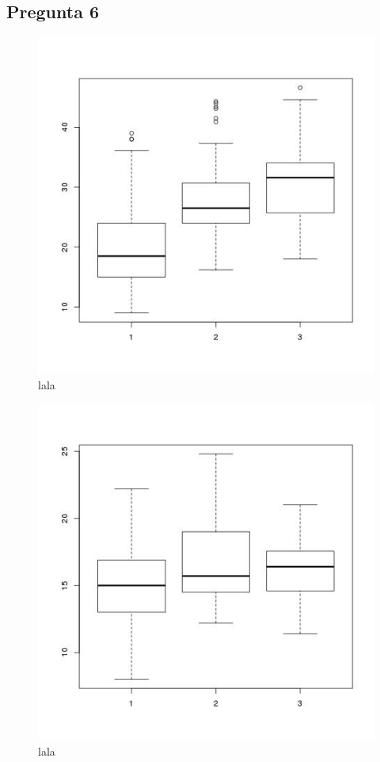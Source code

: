 \documentclass[letter,10pt]{article}
\begin{document}
\newpage
\subsection{Pregunta 6}

\begin{figure}[h!]
    \centering
    \includegraphics[scale=0.5]{boxplot_mpg_origin.jpg}
    \caption{lala}
    \label{fig:lala}
\end{figure}

\begin{figure}[h!]
    \centering
    \includegraphics[scale=0.5]{boxplot_acceleration_origin.jpg}
    \caption{lala}
    \label{fig:lala}
\end{figure}
\end{document}
